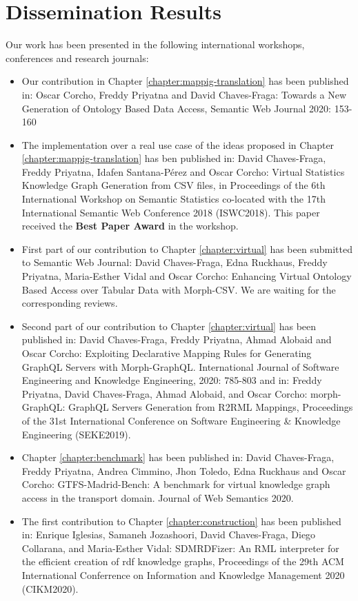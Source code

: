 \section{Dissemination Results}
\label{sec:disresults}

Our work has been presented in the following international workshops, conferences and research journals:

\begin{itemize}
    \item Our contribution in Chapter \ref{chapter:mappig-translation} has been published in: Oscar Corcho, Freddy Priyatna and David Chaves-Fraga: Towards a New Generation of Ontology Based Data Access, Semantic Web Journal 2020: 153-160
    \item The implementation over a real use case of the ideas proposed in Chapter  \ref{chapter:mappig-translation} has ben published in: David Chaves-Fraga, Freddy Priyatna, Idafen Santana-Pérez and Oscar Corcho: Virtual Statistics Knowledge Graph Generation from CSV files, in Proceedings of the 6th International Workshop on Semantic Statistics co-located with the 17th International Semantic Web Conference 2018 (ISWC2018). This paper received the \textbf{Best Paper Award} in the workshop.
    \item First part of our contribution to Chapter \ref{chapter:virtual} has been submitted to Semantic Web Journal: David Chaves-Fraga, Edna Ruckhaus, Freddy Priyatna, Maria-Esther Vidal and Oscar Corcho: Enhancing Virtual Ontology Based Access over Tabular Data with Morph-CSV. We are waiting for the corresponding reviews.
    \item Second part of our contribution to Chapter \ref{chapter:virtual} has been published in: David Chaves-Fraga, Freddy Priyatna, Ahmad Alobaid and Oscar Corcho: Exploiting Declarative Mapping Rules for Generating GraphQL Servers with Morph-GraphQL. International Journal of Software Engineering and Knowledge Engineering, 2020: 785-803 and in: Freddy Priyatna, David Chaves-Fraga, Ahmad Alobaid, and Oscar Corcho: morph-GraphQL: GraphQL Servers Generation from R2RML Mappings, Proceedings of the 31st International Conference on Software Engineering \& Knowledge Engineering (SEKE2019).
    \item Chapter \ref{chapter:benchmark} has been published in: David Chaves-Fraga, Freddy Priyatna, Andrea Cimmino, Jhon Toledo, Edna Ruckhaus and Oscar Corcho: GTFS-Madrid-Bench: A benchmark for virtual knowledge graph access in the transport domain. Journal of Web Semantics 2020.
    \item The first contribution to Chapter \ref{chapter:construction} has been published in: Enrique Iglesias, Samaneh Jozashoori, David Chaves-Fraga, Diego Collarana, and Maria-Esther Vidal: SDMRDFizer: An RML interpreter for the efficient creation of rdf knowledge graphs, Proceedings of the 29th ACM International Conferrence on Information and Knowledge Management 2020 (CIKM2020).

\end{itemize}
